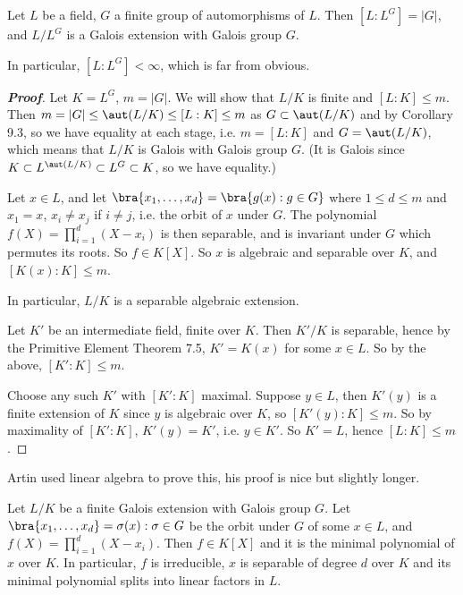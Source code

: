 \begin{theorem}
Let $L$ be a field, $G$ a finite group of automorphisms of $L$. Then $[L : L^G] = |G|$, and $L/L^G$ is a Galois extension with Galois group $G$.

In particular, $[L : L^G] < \infty$, which is far from obvious.
\end{theorem}

\begin{proof}[\bf Proof]
Let $K = L^G$, $m = |G|$. We will show that $L/K$ is finite and $[L : K] \leq m$. Then $m = |G| \leq \aut(L/K) \leq  [L : K] \leq  m$ as $G \subset \aut(L/K)$ and by Corollary 9.3, so we have equality at each stage, i.e. $m = [L : K]$ and $G = \aut(L/K)$, which means that $L/K$ is Galois with Galois group $G$. (It is Galois since $K \subset L^{\aut(L/K)} \subset L^G \subset K$, so we have equality.)

Let $x \in L$, and let $\bra{x_1, \dots , x_d} = \bra{g(x) : g \in G}$ where $1 \leq  d \leq  m$ and $x_1 = x$, $x_i \neq  x_j$ if $i \neq j$, i.e. the orbit of $x$ under $G$. The polynomial $f(X) = \prod^d_{i=1}(X - x_i)$ is then separable, and is invariant under $G$ which permutes its roots. So $f \in K[X]$. So $x$ is algebraic and separable over $K$, and $[K(x) : K] \leq  m$.

In particular, $L/K$ is a separable algebraic extension.

Let $K'$ be an intermediate field, finite over $K$. Then $K'/K$ is separable, hence by the Primitive Element Theorem 7.5, $K' = K(x)$ for some $x \in L$. So by the above, $[K' : K] \leq  m$.

Choose any such $K'$ with $[K' : K]$ maximal. Suppose $y \in L$, then $K'(y)$ is a finite extension of $K$ since $y$ is algebraic over $K$, so $[K'(y) : K] \leq m$. So by maximality of $[K' : K]$, $K'(y) = K'$, i.e. $y \in K'$. So $K' = L$, hence $[L : K] \leq  m$.
\end{proof}

\begin{remark}
Artin used linear algebra to prove this, his proof is nice but slightly longer. 
\end{remark}

\begin{corollary}
Let $L/K$ be a finite Galois extension with Galois group $G$. Let $\bra{x_1, \dots , x_d} = {\sigma(x) : \sigma \in G}$ be the orbit under $G$ of some $x \in L$, and $f(X) = \prod^d_{i=1}(X - x_i)$. Then $f \in K[X]$ and it is the minimal polynomial of $x$ over $K$. In particular, $f$ is irreducible, $x$ is separable of degree $d$ over $K$ and its minimal polynomial splits into linear factors in $L$.
\end{corollary}

